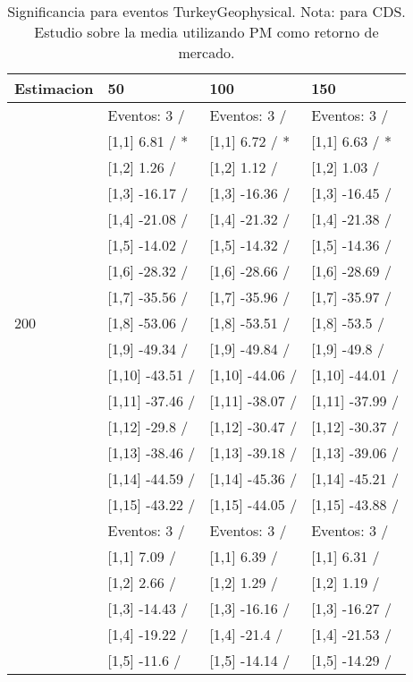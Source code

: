 \begin{table}

\caption{Significancia para eventos TurkeyGeophysical. Nota: para CDS. Estudio sobre la media utilizando PM como retorno de mercado.}
\centering
\begin{tabular}[t]{llll}
\toprule
Estimacion & 50 & 100 & 150\\
\midrule
 & Eventos:  3 / & Eventos:  3 / & Eventos:  3 /\\
 & {}[1,1] 6.81  / * & {}[1,1] 6.72  / * & {}[1,1] 6.63  / *\\
 & {}[1,2] 1.26  / & {}[1,2] 1.12  / & {}[1,2] 1.03  /\\
 & {}[1,3] -16.17  / & {}[1,3] -16.36  / & {}[1,3] -16.45  /\\
 & {}[1,4] -21.08  / & {}[1,4] -21.32  / & {}[1,4] -21.38  /\\
\addlinespace
 & {}[1,5] -14.02  / & {}[1,5] -14.32  / & {}[1,5] -14.36  /\\
 & {}[1,6] -28.32  / & {}[1,6] -28.66  / & {}[1,6] -28.69  /\\
 & {}[1,7] -35.56  / & {}[1,7] -35.96  / & {}[1,7] -35.97  /\\
200 & {}[1,8] -53.06  / & {}[1,8] -53.51  / & {}[1,8] -53.5  /\\
 & {}[1,9] -49.34  / & {}[1,9] -49.84  / & {}[1,9] -49.8  /\\
\addlinespace
 & {}[1,10] -43.51  / & {}[1,10] -44.06  / & {}[1,10] -44.01  /\\
 & {}[1,11] -37.46  / & {}[1,11] -38.07  / & {}[1,11] -37.99  /\\
 & {}[1,12] -29.8  / & {}[1,12] -30.47  / & {}[1,12] -30.37  /\\
 & {}[1,13] -38.46  / & {}[1,13] -39.18  / & {}[1,13] -39.06  /\\
 & {}[1,14] -44.59  / & {}[1,14] -45.36  / & {}[1,14] -45.21  /\\
\addlinespace
 & {}[1,15] -43.22  / & {}[1,15] -44.05  / & {}[1,15] -43.88  /\\
 & Eventos:  3 / & Eventos:  3 / & Eventos:  3 /\\
 & {}[1,1] 7.09  / & {}[1,1] 6.39  / & {}[1,1] 6.31  /\\
 & {}[1,2] 2.66  / & {}[1,2] 1.29  / & {}[1,2] 1.19  /\\
 & {}[1,3] -14.43  / & {}[1,3] -16.16  / & {}[1,3] -16.27  /\\
\addlinespace
 & {}[1,4] -19.22  / & {}[1,4] -21.4  / & {}[1,4] -21.53  /\\
 & {}[1,5] -11.6  / & {}[1,5] -14.14  / & {}[1,5] -14.29  /\\

\end{tabular}
\end{table}
